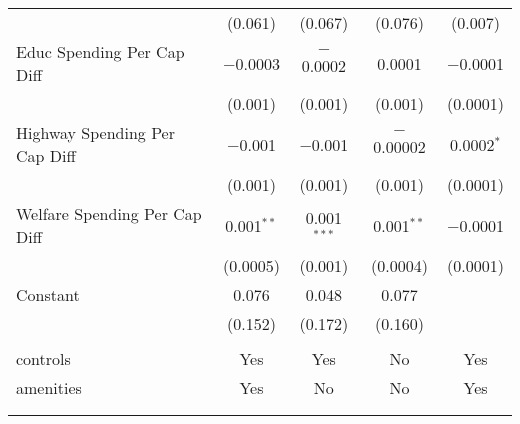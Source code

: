 \begin{table}[!htbp]
\begin{tabular}{@{\extracolsep{5pt}}lcccc}
  & (0.061) & (0.067) & (0.076) & (0.007) \\ 
  Educ Spending Per Cap Diff & $-$0.0003 & $-$0.0002 & 0.0001 & $-$0.0001 \\ 
  & (0.001) & (0.001) & (0.001) & (0.0001) \\ 
  Highway Spending Per Cap Diff & $-$0.001 & $-$0.001 & $-$0.00002 & 0.0002$^{*}$ \\ 
  & (0.001) & (0.001) & (0.001) & (0.0001) \\ 
  Welfare Spending Per Cap Diff & 0.001$^{**}$ & 0.001$^{***}$ & 0.001$^{**}$ & $-$0.0001 \\ 
  & (0.0005) & (0.001) & (0.0004) & (0.0001) \\ 
  Constant & 0.076 & 0.048 & 0.077 &  \\ 
  & (0.152) & (0.172) & (0.160) &  \\ 
 \hline \\[-1.8ex] 
controls & Yes & Yes & No & Yes \\ 
amenities & Yes & No & No & Yes \\ 
\hline \\[-1.8ex] 
\hline 
\hline \\[-1.8ex] 
\end{tabular} 
\end{table} 
